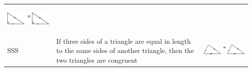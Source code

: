 \begin{center}
\begin{xtabular*}{\mytablewidth}[t]{|p{10\mystarwidth}|p{10\mystarwidth}|p{10\mystarwidth}|}
    
        
                    
    \setcounter{subfigure}{0}

\label{m39368*id318071}
    \begin{center}
    \label{m39368*id318071!!!underscore!!!media}\label{m39368*id318071!!!underscore!!!printimage}\includegraphics[width=.25\columnwidth]{col11306.imgs/m39368_MG10C13_031.png} %
        
      \vspace{2pt}
    \vspace{.1in}
    
    \end{center}



    \addtocounter{footnote}{-0}
    
     \tabularnewline{}
    
    
        SSS &
    
    
        If three sides of a triangle are equal in length to the same sides of another triangle, then the two triangles are congruent &
    
    
        
                    
    \setcounter{subfigure}{0}

\label{m39368*id318107}
    \begin{center}
    \label{m39368*id318107!!!underscore!!!media}\label{m39368*id318107!!!underscore!!!printimage}\includegraphics[width=.25\columnwidth]{col11306.imgs/m39368_MG10C13_032.png} %
        

\end{center}
\end{xtabular*}
\end{center}
